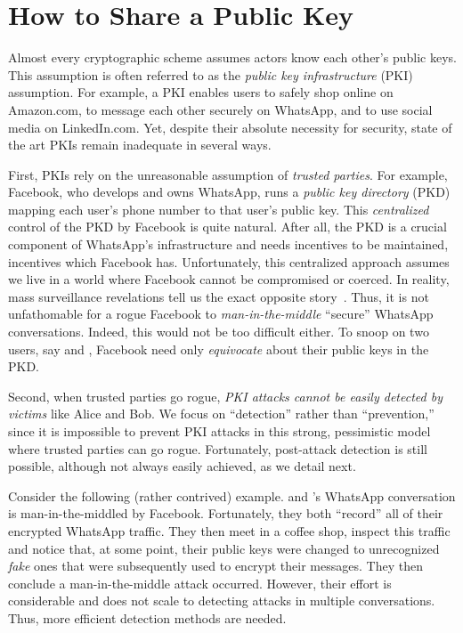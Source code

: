 \section{How to Share a Public Key}
\label{s:intro:part1}

Almost every cryptographic scheme assumes actors know each other's public keys.
This assumption is often referred to as the \textit{public key infrastructure} (PKI) assumption.
For example, a PKI enables users to safely shop online on Amazon.com, to message each other securely on WhatsApp, and to use social media on LinkedIn.com.
Yet, despite their absolute necessity for security, state of the art PKIs remain inadequate in several ways.

First, PKIs rely on the unreasonable assumption of \textit{trusted parties}.
For example, Facebook, who develops and owns WhatsApp, runs a \textit{public key directory} (PKD) mapping each user's phone number to that user's public key.
This \textit{centralized} control of the PKD by Facebook is quite natural. 
After all, the PKD is a crucial component of WhatsApp's infrastructure and needs incentives to be maintained, incentives which Facebook has.
Unfortunately, this centralized approach assumes we live in a world where Facebook cannot be compromised or coerced.
In reality, mass surveillance revelations tell us the exact opposite story~\cite{EdSnowden,AAB+15}.
Thus, it is not unfathomable for a rogue Facebook to \textit{man-in-the-middle} ``secure'' WhatsApp conversations.
Indeed, this would not be too difficult either.
To snoop on two users, say \textit{\alice} and \textit{\bob}, Facebook need only \textit{equivocate} about their public keys in the PKD.

Second, when trusted parties go rogue, \textit{PKI attacks cannot be easily detected by victims} like Alice and Bob.
We focus on ``detection'' rather than ``prevention,'' since it is impossible to prevent PKI attacks in this strong, pessimistic model where trusted parties can go rogue.
Fortunately, post-attack detection is still possible, although not always easily achieved, as we detail next.

Consider the following (rather contrived) example.
\alice and \bob's WhatsApp conversation is man-in-the-middled by Facebook.
Fortunately, they both ``record'' all of their encrypted WhatsApp traffic.
They then meet in a coffee shop, inspect this traffic and notice that, at some point, their public keys were changed to unrecognized \textit{fake} ones that were subsequently used to encrypt their messages.
They then conclude a man-in-the-middle attack occurred.
However, their effort is considerable and does not scale to detecting attacks in multiple conversations.
Thus, more efficient detection methods are needed.

